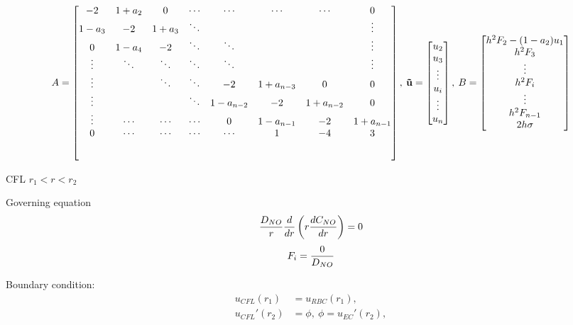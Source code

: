 \documentclass[8pt, a4paper]{article}
\begin{document}
  \setlength{\extrarowheight}{1.25\baselineskip}
  \begin{equation}
  A=
  \begin{bmatrix}
  -2 & 1+a_2 & 0 & \cdots & \cdots & \cdots & \cdots & 0\\
  1-a_3 & -2 & 1+a_3 & \ddots & & & & \vdots\\
  0 & 1-a_4 & -2 & \ddots & \ddots & &  & \vdots\\
  \vdots & \ddots & \ddots & \ddots & \ddots & & & \vdots\\
  \vdots & & \ddots & \ddots & -2 & 1+a_{n-3} & 0 & 0 \\
  \vdots & & & \ddots & 1-a_{n-2} & -2 & 1+a_{n-2} & 0\\
  \vdots & \cdots & \cdots & \cdots & 0 & 1-a_{n-1} & -2 & 1+a_{n-1}\\
  0 & \cdots & \cdots & \cdots & \cdots & 1 & -4 & 3\\[5ex]
  \end{bmatrix},\:
  \mathbf{\vec{u}}=
  \begin{bmatrix}
  u_2\\
  u_3\\
  \vdots\\
  u_i\\
  \vdots\\
  u_n
  \end{bmatrix},\:
  B=
  \begin{bmatrix}
  h^2F_2-(1-a_2)u_1\\
  h^2F_3\\
  \vdots\\
  h^2F_i\\
  \vdots\\
  h^2F_{n-1}\\
  2h\sigma
  \end{bmatrix}
  \end{equation}

  CFL $r_1<r<r_2$
  
  Governing equation
  \begin{equation*}
  \frac{D_{NO}}{r}\frac{d}{dr}\left(r\frac{dC_{NO}}{dr}\right)=0
  \end{equation*}
  \begin{equation*}
  F_i=\frac{0}{D_{NO}}
  \end{equation*}
  
  Boundary condition:
  \begin{align*}
  u_{CFL}(r_1)&=u_{RBC}(r_1),\\
  u_{CFL}'(r_2)&=\phi,\:\phi=u_{EC}'(r_2),\\
  \end{align*}
  
\end{document}
